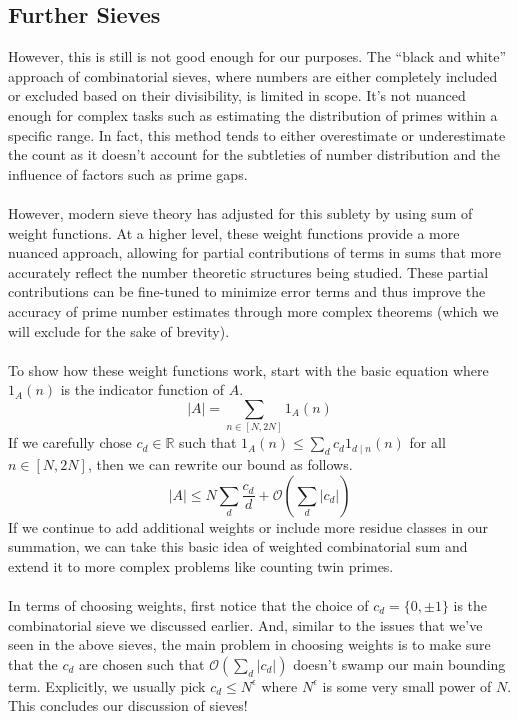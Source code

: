 \documentclass[10pt]{extarticle}
\begin{document}
\subsection{Further Sieves} 
However, this is still is not good enough for our purposes. The ``black and white'' approach of combinatorial sieves, where numbers are either completely included or excluded based on their divisibility, is limited in scope. 
It's not nuanced enough for complex tasks such as estimating the distribution of primes within a specific range. In fact, this method tends to either overestimate or underestimate the count as it doesn't account for the subtleties of number distribution and the influence of factors such as prime gaps. \\
\\
However, modern sieve theory has adjusted for this sublety by using sum of weight functions. 
At a higher level, these weight functions provide a more nuanced approach, allowing for partial contributions of terms in sums that more accurately reflect the number theoretic structures being studied. 
These partial contributions can be fine-tuned to minimize error terms and thus improve the accuracy of prime number estimates through more complex theorems (which we will exclude for the sake of brevity). \\
\\
To show how these weight functions work, start with the basic equation where $1_A(n)$ is the indicator function of $A$.
$$
|A| = \sum_{n \in [N,2N]} 1_A(n)
$$
If we carefully chose $c_d \in \mathbb{R}$ such that $1_A(n) \leq \sum_{d} c_d 1_{d \mid n} (n)$ for all $n \in [N,2N]$, then we can rewrite our bound as follows.
$$
|A| \leq N \sum_{d} \frac{c_d}{d} + \mathcal{O}\left(\sum_{d} |c_d| \right)
$$
If we continue to add additional weights or include more residue classes in our summation, we can take this basic idea of weighted combinatorial sum and extend it to more complex problems like counting twin primes.\\
\\
In terms of choosing weights, first notice that the choice of $c_d = \{0,\pm 1\}$ is the combinatorial sieve we discussed earlier. 
And, similar to the issues that we've seen in the above sieves, the main problem in choosing weights is to make sure that the $c_d$ are chosen such that $\mathcal{O}\left(\sum_{d} |c_d|\right)$ doesn't swamp our main bounding term. Explicitly, we usually pick $c_d \leq N^\epsilon$ where $N^\epsilon$ is some very small power of $N$. This concludes our discussion of sieves!
\end{document}
